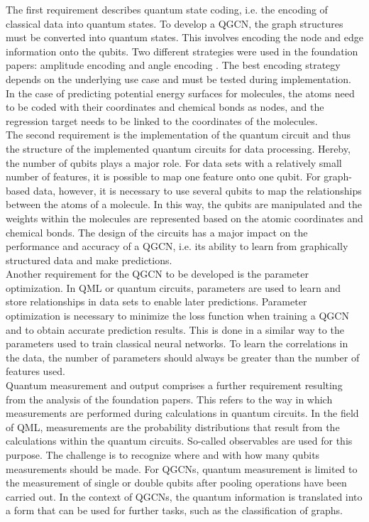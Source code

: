 The first requirement describes quantum state coding, i.e. the encoding of classical data into quantum states. To develop a QGCN, the graph structures must be converted into quantum states. This involves encoding the node and edge information onto the qubits. Two different strategies were used in the foundation papers: amplitude encoding \cite{zheng2021quantum} and angle encoding \cite{ryu2023quantum}. The best encoding strategy depends on the underlying use case and must be tested during implementation. In the case of predicting potential energy surfaces for molecules, the atoms need to be coded with their coordinates and chemical bonds as nodes, and the regression target needs to be linked to the coordinates of the molecules. \\

The second requirement is the implementation of the quantum circuit and thus the structure of the implemented quantum circuits for data processing. Hereby, the number of qubits plays a major role. For data sets with a relatively small number of features, it is possible to map one feature onto one qubit. For graph-based data, however, it is necessary to use several qubits to map the relationships between the atoms of a molecule. In this way, the qubits are manipulated and the weights within the molecules are represented based on the atomic coordinates and chemical bonds. The design of the circuits has a major impact on the performance and accuracy of a QGCN, i.e. its ability to learn from graphically structured data and make predictions. \\

Another requirement for the QGCN to be developed is the parameter optimization. In QML or quantum circuits, parameters are used to learn and store relationships in data sets to enable later predictions. Parameter optimization is necessary to minimize the loss function when training a QGCN and to obtain accurate prediction results. This is done in a similar way to the parameters used to train classical neural networks. To learn the correlations in the data, the number of parameters should always be greater than the number of features used. \\

Quantum measurement and output comprises a further requirement resulting from the analysis of the foundation papers. This refers to the way in which measurements are performed during calculations in quantum circuits. In the field of QML, measurements are the probability distributions that result from the calculations within the quantum circuits. So-called observables are used for this purpose. The challenge is to recognize where and with how many qubits measurements should be made. For QGCNs, quantum measurement is limited to the measurement of single or double qubits after pooling operations have been carried out. In the context of QGCNs, the quantum information is translated into a form that can be used for further tasks, such as the classification of graphs. \\


